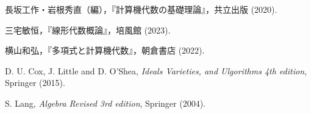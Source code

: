 \documentclass[12pt, uplatex, dvipdfmx]{jsarticle}
\theoremstyle{definition}
\begin{document}
\begin{thebibliography}{99}
 長坂工作・岩根秀直（編），『計算機代数の基礎理論』，共立出版 (2020).

 三宅敏恒，『線形代数概論』，培風館 (2023).

 横山和弘，『多項式と計算機代数』，朝倉書店 (2022).

 D. U. Cox, J. Little and D. O'Shea, \textit{Ideals Varieties, and Ulgorithms 4th edition}, Springer (2015).

 S. Lang, \textit{Algebra Revised 3rd edition}, Springer (2004). 
\end{thebibliography}
\end{document}
